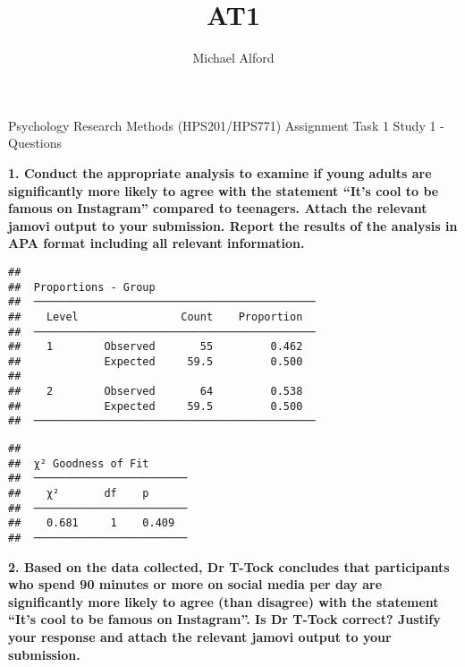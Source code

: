 \documentclass[
]{article}
\title{AT1}
\author{Michael Alford}
\date{}
\begin{document}
\maketitle

Psychology Research Methods (HPS201/HPS771) Assignment Task 1 Study 1 -
Questions

\textbf{1. Conduct the appropriate analysis to examine if young adults
are significantly more likely to agree with the statement ``It's cool to
be famous on Instagram'' compared to teenagers. Attach the relevant
jamovi output to your submission. Report the results of the analysis in
APA format including all relevant information.}

\begin{verbatim}
## 
##  Proportions - Group                          
##  ──────────────────────────────────────────── 
##    Level                Count    Proportion   
##  ──────────────────────────────────────────── 
##    1        Observed       55         0.462   
##             Expected     59.5         0.500   
##                                               
##    2        Observed       64         0.538   
##             Expected     59.5         0.500   
##  ────────────────────────────────────────────
\end{verbatim}

\begin{verbatim}
## 
##  χ² Goodness of Fit       
##  ──────────────────────── 
##    χ²       df    p       
##  ──────────────────────── 
##    0.681     1    0.409   
##  ────────────────────────
\end{verbatim}

\textbf{2. Based on the data collected, Dr T-Tock concludes that
participants who spend 90 minutes or more on social media per day are
significantly more likely to agree (than disagree) with the statement
``It's cool to be famous on Instagram''. Is Dr T-Tock correct? Justify
your response and attach the relevant jamovi output to your submission.}
\end{document}
